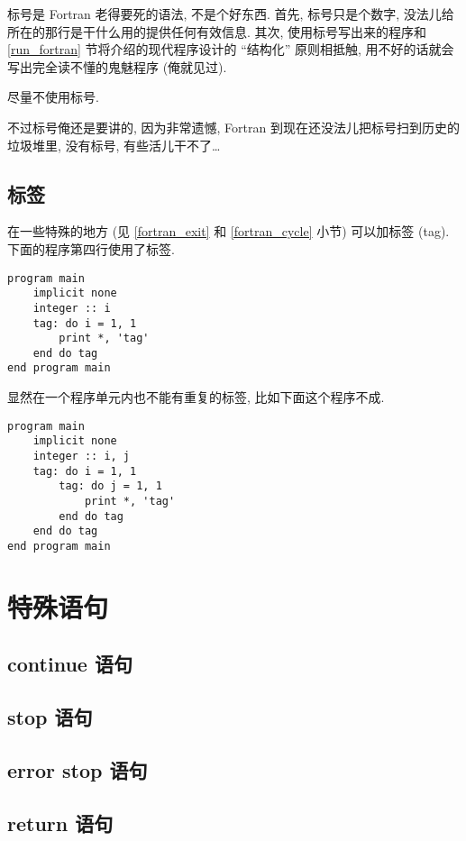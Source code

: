 标号是 Fortran 老得要死的语法, 不是个好东西. 首先, 标号只是个数字, 没法儿给所在的那行是干什么用的提供任何有效信息. 其次, 使用标号写出来的程序和 \ref{run_fortran} 节将介绍的现代程序设计的 ``结构化'' 原则相抵触, 用不好的话就会写出完全读不懂的鬼魅程序 (俺就见过).
\begin{convention}
    尽量不使用标号.
\end{convention}
不过标号俺还是要讲的, 因为非常遗憾, Fortran 到现在还没法儿把标号扫到历史的垃圾堆里, 没有标号, 有些活儿干不了\dots{}

\subsection{标签}

在一些特殊的地方 (见 \ref{fortran_exit} 和 \ref{fortran_cycle} 小节) 可以加标签 (tag). 下面的程序第四行使用了标签.
\begin{lstlisting}
program main
    implicit none
    integer :: i
    tag: do i = 1, 1
        print *, 'tag'
    end do tag
end program main
\end{lstlisting}

显然在一个程序单元内也不能有重复的标签, 比如下面这个程序不成.
\begin{lstlisting}
program main
    implicit none
    integer :: i, j
    tag: do i = 1, 1
        tag: do j = 1, 1
            print *, 'tag'
        end do tag
    end do tag
end program main
\end{lstlisting}

\section{特殊语句}

\subsection{continue 语句}

\subsection{stop 语句}

\subsection{error stop 语句}

\subsection{return 语句}

